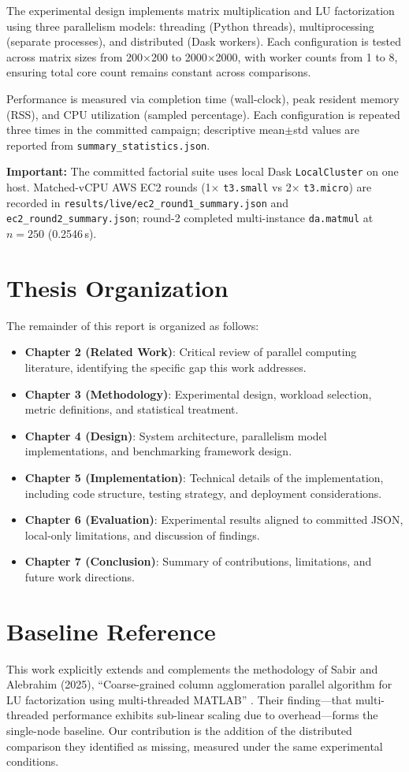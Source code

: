 The experimental design implements matrix multiplication and LU factorization using three parallelism models: threading (Python threads), multiprocessing (separate processes), and distributed (Dask workers). Each configuration is tested across matrix sizes from 200×200 to 2000×2000, with worker counts from 1 to 8, ensuring total core count remains constant across comparisons.

Performance is measured via completion time (wall-clock), peak resident memory (RSS), and CPU utilization (sampled percentage). Each configuration is repeated three times in the committed campaign; descriptive mean$\pm$std values are reported from \texttt{summary\_statistics.json}.

\textbf{Important:} The committed factorial suite uses local Dask \texttt{LocalCluster} on one host. Matched-vCPU AWS EC2 rounds (1× \texttt{t3.small} vs 2× \texttt{t3.micro}) are recorded in \texttt{results/live/ec2\_round1\_summary.json} and \texttt{ec2\_round2\_summary.json}; round-2 completed multi-instance \texttt{da.matmul} at $n{=}250$ (0.2546\,s).

\section{Thesis Organization}

The remainder of this report is organized as follows:

\begin{itemize}
    \item \textbf{Chapter 2 (Related Work)}: Critical review of parallel computing literature, identifying the specific gap this work addresses.
    \item \textbf{Chapter 3 (Methodology)}: Experimental design, workload selection, metric definitions, and statistical treatment.
    \item \textbf{Chapter 4 (Design)}: System architecture, parallelism model implementations, and benchmarking framework design.
    \item \textbf{Chapter 5 (Implementation)}: Technical details of the implementation, including code structure, testing strategy, and deployment considerations.
    \item \textbf{Chapter 6 (Evaluation)}: Experimental results aligned to committed JSON, local-only limitations, and discussion of findings.
    \item \textbf{Chapter 7 (Conclusion)}: Summary of contributions, limitations, and future work directions.
\end{itemize}

\section{Baseline Reference}

This work explicitly extends and complements the methodology of Sabir and Alebrahim (2025), ``Coarse-grained column agglomeration parallel algorithm for LU factorization using multi-threaded MATLAB'' \cite{sabir2025coarse}. Their finding—that multi-threaded performance exhibits sub-linear scaling due to overhead—forms the single-node baseline. Our contribution is the addition of the distributed comparison they identified as missing, measured under the same experimental conditions.

